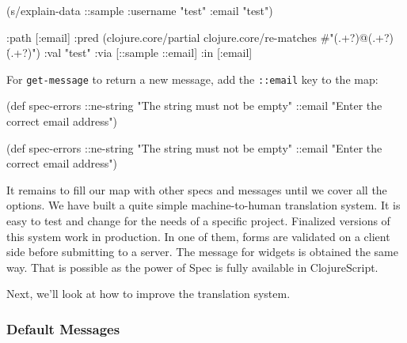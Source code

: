 \else

\begin{english}
  \begin{clojure}
(s/explain-data ::sample {:username "test" :email "test"})

{:path [:email]
 :pred
 (clojure.core/partial
  clojure.core/re-matches
  #"(.+?)@(.+?)\.(.+?)")
 :val "test"
 :via [::sample ::email]
 :in [:email]}
  \end{clojure}
\end{english}

\fi

For \verb|get-message| to return a new message, add the \verb|::email| key to the map:

\ifx\DEVICETYPE\MOBILE

  \begin{clojure}
(def spec-errors
  {::ne-string
   "The string must not be empty"
   ::email
   "Enter the correct email address"})
  \end{clojure}

\else

  \begin{clojure}
(def spec-errors
  {::ne-string "The string must not be empty"
   ::email "Enter the correct email address"})
  \end{clojure}

\fi


It remains to fill our map with other specs and messages until we cover all the options. We have built a quite simple machine-to-human translation system. It is easy to test and change for the needs of a specific project. Finalized versions of this system work in production. In one of them, forms are validated on a client side before submitting to a server. The message for widgets is obtained the same way. That is possible as the power of Spec is fully available in ClojureScript.

Next, we'll look at how to improve the translation system.

\subsubsection{Default Messages}

